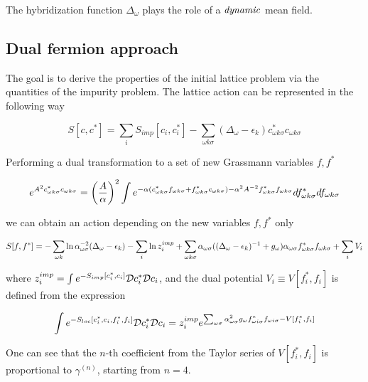 The hybridization function $\Delta_\omega$ plays the role of a $\it{dynamic}$ mean field.

\subsection{Dual fermion approach}
The goal is to derive the properties of the initial lattice problem via the quantities
of the impurity problem.
The lattice action can be represented in the following way

\[ S[c,c^*] = \sum_i S_{imp}[c_i,c_i^*] - \sum_{\omega k \sigma}(\Delta_\omega-\epsilon_k)c_{\omega k\sigma}^* c_{\omega k\sigma} \]

Performing a dual transformation to a set of new Grassmann variables $f,f^*$

\[ e^{A^2 c_{\omega k\sigma}^*c_{\omega k\sigma}} = \left(\frac{A}{\alpha}\right)^2 \int 
    e^{-\alpha(c_{\omega k\sigma}^*f_{\omega k\sigma}+f_{\omega k\sigma}^*c_{\omega k\sigma})-\alpha^2 A^{-2}f_{\omega k\sigma}^*f_{\omega k\sigma}}df_{\omega k\sigma}^*df_{\omega k\sigma}
 \]

we can obtain an action depending on the new variables $f,f^*$ only

\[ S[f,f^*] = -\sum_{\omega k} \ln{\alpha_{\omega\sigma}^{-2}(\Delta_\omega-\epsilon_k)} 
    - \sum_i\ln{z_i^{imp}} + \sum_{\omega k\sigma} \alpha_{\omega\sigma}((\Delta_\omega-\epsilon_k)^{-1}+g_\omega)
    \alpha_{\omega\sigma}f_{\omega k\sigma}^*f_{\omega k\sigma}+\sum_i V_i \]

where $z_i^{imp} = \int e^{-S_{imp}[c_i^*,c_i]}\mathcal{D} c_i^*\mathcal{D} c_i$, and the dual potential $V_i \equiv V[f_i^*,f_i]$
is defined from the expression

\[ \int e^{-S_{loc}[c_i^*,c_i,f_i^*,f_i]}\mathcal{D} c_i^*\mathcal{D} c_i = 
  z_i^{imp}e^{\sum_{\omega\sigma}\alpha_{\omega\sigma}^2g_\omega f_{\omega i \sigma}^*f_{\omega i \sigma} - V[f_i^*,f_i]} \]

One can see that the $n$-th coefficient from the Taylor series of 
$V[f_i^*,f_i]$ is proportional to $\gamma^{(n)}$, starting from $n=4$.